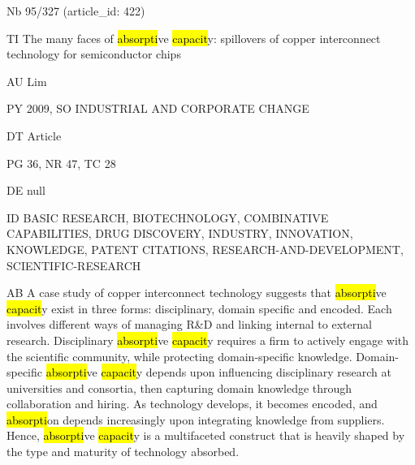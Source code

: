 \documentclass[a4paper]{article}
\begin{document}
\vspace*{-2cm}
Nb \tabto{0cm}95/327 (article\_id: 422)\par
TI \tabto{0cm}The many faces of \hl{absorpti}ve \hl{capacit}y: spillovers of copper interconnect technology for semiconductor chips\par
AU \tabto{0cm}Lim\par
PY \tabto{0cm}2009, SO INDUSTRIAL AND CORPORATE CHANGE\par
DT \tabto{0cm}Article\par
PG \tabto{0cm}36, NR 47, TC 28\par
DE \tabto{0cm}null\par
ID \tabto{0cm}BASIC RESEARCH, BIOTECHNOLOGY, COMBINATIVE CAPABILITIES, DRUG DISCOVERY, INDUSTRY, INNOVATION, KNOWLEDGE, PATENT CITATIONS, RESEARCH-AND-DEVELOPMENT, SCIENTIFIC-RESEARCH\par
AB \tabto{0cm}A case study of copper interconnect technology suggests that \hl{absorpti}ve \hl{capacit}y exist in three forms: disciplinary, domain specific and encoded. Each involves different ways of managing R\&D and linking internal to external research. Disciplinary \hl{absorpti}ve \hl{capacit}y requires a firm to actively engage with the scientific community, while protecting domain-specific knowledge. Domain-specific \hl{absorpti}ve \hl{capacit}y depends upon influencing disciplinary research at universities and consortia, then capturing domain knowledge through collaboration and hiring. As technology develops, it becomes encoded, and \hl{absorpti}on depends increasingly upon integrating knowledge from suppliers. Hence, \hl{absorpti}ve \hl{capacit}y is a multifaceted construct that is heavily shaped by the type and maturity of technology absorbed.\par
\clearpage
\end{document}
